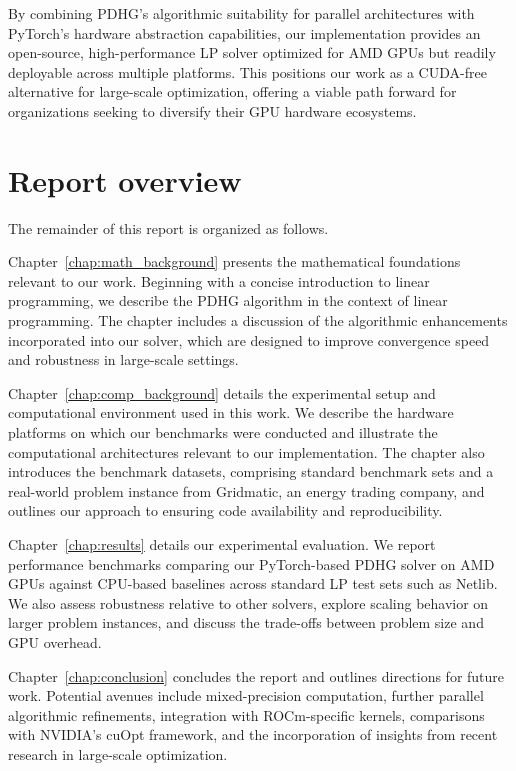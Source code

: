 \documentclass[twoside,12pt,openright]{report}  %
\begin{document}
By combining PDHG’s algorithmic suitability for parallel architectures with PyTorch’s hardware abstraction capabilities, our implementation provides an open-source, high-performance LP solver optimized for AMD GPUs but readily deployable across multiple platforms. This positions our work as a CUDA-free alternative for large-scale optimization, offering a viable path forward for organizations seeking to diversify their GPU hardware ecosystems.

\section{Report overview}
The remainder of this report is organized as follows.  

Chapter~\ref{chap:math_background} presents the mathematical foundations relevant to our work. Beginning with a concise introduction to linear programming, we describe the PDHG algorithm in the context of linear programming. The chapter includes a discussion of the algorithmic enhancements incorporated into our solver, which are designed to improve convergence speed and robustness in large-scale settings.

Chapter~\ref{chap:comp_background} details the experimental setup and computational environment used in this work. We describe the hardware platforms on which our benchmarks were conducted and illustrate the computational architectures relevant to our implementation. The chapter also introduces the benchmark datasets, comprising standard benchmark sets and a real-world problem instance from Gridmatic, an energy trading company, and outlines our approach to ensuring code availability and reproducibility.

Chapter~\ref{chap:results} details our experimental evaluation. We report performance benchmarks comparing our PyTorch-based PDHG solver on AMD GPUs against CPU-based baselines across standard LP test sets such as Netlib. We also assess robustness relative to other solvers, explore scaling behavior on larger problem instances, and discuss the trade-offs between problem size and GPU overhead.  

Chapter~\ref{chap:conclusion} concludes the report and outlines directions for future work. Potential avenues include mixed-precision computation, further parallel algorithmic refinements, integration with ROCm-specific kernels, comparisons with NVIDIA’s cuOpt framework, and the incorporation of insights from recent research in large-scale optimization.  
\end{document}
